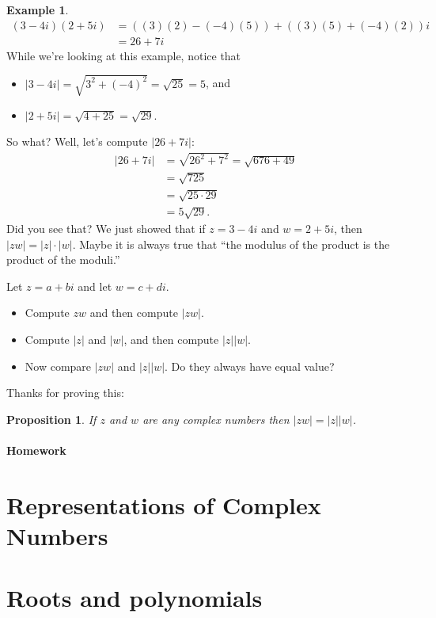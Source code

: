 \documentclass[11pt]{article}
\newenvironment{task}
	{\begin{mdframed}[linecolor=lightgray, linewidth=3pt]\raggedright}
	{\end{mdframed}}
\newtheorem{proposition}[theorem]{Proposition}
\theoremstyle{definition}
\newtheorem{example}[theorem]{Example}
\begin{document}
\begin{example}
  \begin{align*}
    \left( 3-4i \right)\left( 2+5i \right) &= \left( (3)(2)-(-4)(5) \right)+\left( (3)(5)+(-4)(2) \right)i\\
                                           &= 26 + 7i
  \end{align*}
  While we're looking at this example, notice that
  \begin{itemize}
    \item $|3-4i| = \sqrt{3^2 + (-4)^2} = \sqrt{25} = 5$, and
    \item $|2+5i| = \sqrt{4 + 25} = \sqrt{29}$.
  \end{itemize}
  So what? Well, let's compute $|26+7i|$:
  \begin{align*}
    |26 + 7i| &= \sqrt{26^2 + 7^2} = \sqrt{676+49}\\
              &= \sqrt{725}\\
              &= \sqrt{25\cdot 29}\\
              &= 5\sqrt{29}.
  \end{align*}
  Did you see that? We just showed that if $z=3-4i$ and $w=2+5i$, then $|zw| = |z|\cdot|w|$. Maybe it is
  always true that ``the modulus of the product is the product of the moduli.''
\end{example}

\begin{task}
   Let $z=a+bi$ and let $w=c+di$.
  \begin{itemize}
    \item Compute $zw$ and then compute $|zw|$.
    \item Compute $|z|$ and $|w|$, and then compute $|z||w|$.
    \item Now compare $|zw|$ and $|z||w|$. Do they always have equal value?
  \end{itemize}
\end{task}

Thanks for proving this:

\begin{proposition}
  If $z$ and $w$ are any complex numbers then $|zw|=|z||w|$.
\end{proposition}

\newpage
\subsection{Homework}

\newpage

\part{Representations of Complex Numbers}

\part{Roots and polynomials}
\end{document}

